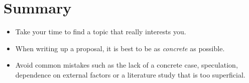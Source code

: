 \section{Summary}
\label{sec:subjectsummary}

\begin{itemize}
 \item Take your time to find a topic that really interests you.
 \item When writing up a proposal, it is best to be as \emph{concrete} as possible.
 \item Avoid common mistakes such as the lack of a concrete case, speculation, dependence on external factors or a literature study that is too superficial.
\end{itemize}
